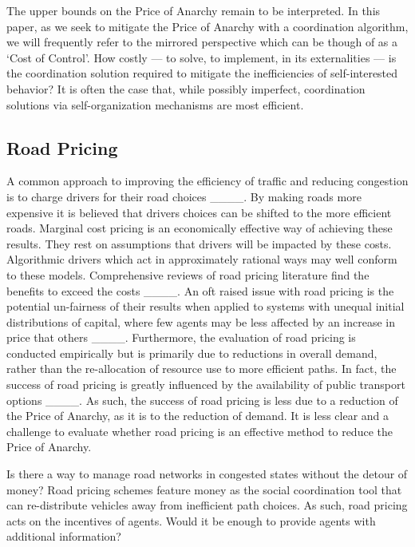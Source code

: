 The upper bounds on the Price of Anarchy remain to be interpreted. In this paper, as we seek to mitigate the Price of Anarchy with a coordination algorithm, we will frequently refer to the mirrored perspective which can be though of as a `Cost of Control'. How costly --- to solve, to implement, in its externalities --- is the coordination solution required to mitigate the inefficiencies of self-interested behavior? It is often the case that, while possibly imperfect, coordination solutions via self-organization mechanisms are most efficient.


\subsection{Road Pricing}

A common approach to improving the efficiency of traffic and reducing congestion is to charge drivers for their road choices ____. By making roads more expensive it is believed that drivers choices can be shifted to the more efficient roads. Marginal cost pricing is an economically effective way of achieving these results. They rest on assumptions that drivers will be impacted by these costs. Algorithmic drivers which act in approximately rational ways may well conform to these models. Comprehensive reviews of road pricing literature find the benefits to exceed the costs ____. An oft raised issue with road pricing is the potential un-fairness of their results when applied to systems with unequal initial distributions of capital, where few agents may be less affected by an increase in price that others ____. Furthermore, the evaluation of road pricing is conducted empirically but is primarily due to reductions in overall demand, rather than the re-allocation of resource use to more efficient paths. In fact, the success of road pricing is greatly influenced by the availability of public transport options ____. As such, the success of road pricing is less due to a reduction of the Price of Anarchy, as it is to the reduction of demand. It is less clear and a challenge to evaluate whether road pricing is an effective method to reduce the Price of Anarchy.



Is there a way to manage road networks in congested states without the detour of money? Road pricing schemes feature money as the social coordination tool that can re-distribute vehicles away from inefficient path choices. As such, road pricing acts on the 
incentives of agents. Would it be enough to provide agents with additional information? 

